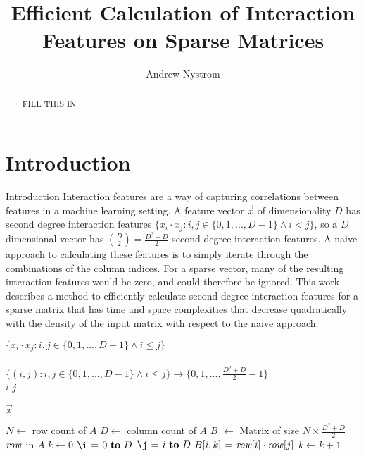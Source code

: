 \documentclass[11pt]{article}
\begin{document}
\title{Efficient Calculation of Interaction Features on Sparse Matrices}
\author{Andrew Nystrom}
\date{}

\maketitle

\begin{abstract}%
FILL THIS IN
\end{abstract}

\section{Introduction}

Introduction
Interaction features are a way of capturing correlations between features in a machine 
learning setting. A feature vector $\vec{x}$ of dimensionality $D$ has second degree interaction features 
$\{x_i \cdot x_j : i, j \in \{0,1,..., D-1\} \land i < j\}$, 
so a $D$ dimensional vector has $\binom{D}{2} = \frac{D^2-D}{2}$ second degree interaction features. A naive
approach to calculating these features is to simply iterate through the combinations of the column indices.
For a sparse vector, many of the resulting interaction features would be zero, and could therefore be ignored.
This work describes a method to efficiently calculate second degree interaction features for a sparse matrix 
that has time and space complexities that decrease quadratically with the density of the input matrix with respect to the naive approach.

$\{x_i \cdot x_j : i, j \in \{0,1,..., D-1\} \land i \le j\}$  \\
\\
$\{(i,j) : i, j \in \{0,1,..., D-1\} \land i \le j\} \to \{0, 1, ..., \frac{D^2+D}{2}-1\}$ \\

$i$
$j$

$\vec{x}$

\begin{codebox}
    \zi $N \gets$ row count of $A$
    \zi $D \gets$ column count of $A$
    \zi $B$ $\gets$ Matrix of size $N \times \frac{D^2+D}{2}$
    \zi \For $\id{row}$ in $A$ \Do
    \zi     $k \gets 0$
    \zi     \For $\i \gets 0 \To D$ \Do
    \zi         \For $\j \gets i \To D$ \Do
    \zi             $B[i, k] \gets \id{row}[i] \cdot \id{row}[j]$
    \zi             $k \gets k + 1$
                \End
            \End
       	\End
\end{codebox}
\end{document}

